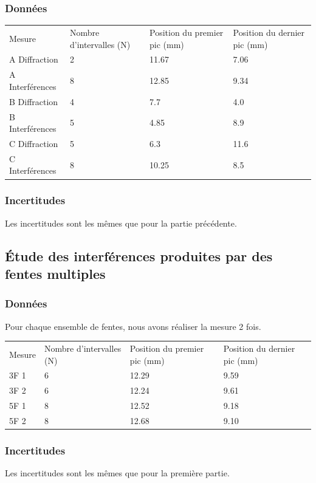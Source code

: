 \documentclass[a4paper,9pt,french]{scrartcl}
\begin{document}
\subsubsection{Données}
\begin{center}
\begin{tabular}{llll}
Mesure & Nombre d'intervalles (N) & Position du premier pic (mm) & Position du dernier pic (mm)\\
A Diffraction & 2 & 11.67 & 7.06\\
A Interférences & 8 & 12.85 & 9.34\\
B Diffraction & 4 & 7.7 & 4.0\\
B Interférences & 5 & 4.85 & 8.9\\
C Diffraction & 5 & 6.3 & 11.6\\
C Interférences & 8 & 10.25 & 8.5\\
\end{tabular}
\end{center}
\subsubsection{Incertitudes}
Les incertitudes sont les m\^emes que pour la partie précédente.
\subsection{Étude des interférences produites par des fentes multiples}

\subsubsection{Données}
Pour chaque ensemble de fentes, nous avons réaliser la mesure 2 fois.
\begin{center}
\begin{tabular}{llll}
Mesure & Nombre d'intervalles (N) & Position du premier pic (mm) & Position du dernier pic (mm)\\
3F 1 & 6 & 12.29 & 9.59\\
3F 2 & 6 & 12.24 & 9.61\\
5F 1 & 8 & 12.52 & 9.18\\
5F 2 & 8 & 12.68 & 9.10
\end{tabular}
\end{center}

\subsubsection{Incertitudes}
Les incertitudes sont les m\^emes que pour la première partie.
\end{document}
